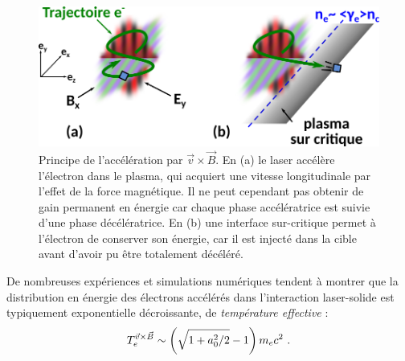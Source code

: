 \begin{refsection}
\begin{figure}[hbtp]
    \centering
    \includegraphics[width=0.7\linewidth]{2-laser/acceleration_magnetique.png}
    \caption{Principe de l'accélération par $\vec{v} \times \vec{B}$. En (a) le laser accélère l'électron dans le plasma, qui acquiert une vitesse longitudinale par l'effet de la force magnétique. Il ne peut cependant pas obtenir de gain permanent en énergie car chaque phase accélératrice est suivie d'une phase décélératrice. En (b) une interface sur-critique permet à l'électron de conserver son énergie, car il est injecté dans la cible avant d'avoir pu être totalement décéléré.}
    \label{fig:2-acceleration_magnetique}
\end{figure}

De nombreuses expériences et simulations numériques tendent à montrer que la distribution en énergie des électrons accélérés dans l'interaction laser-solide est typiquement exponentielle décroissante, de \textit{température effective} \parencite{macchi_2012} :
\begin{equation}
    T_e^{\vec{v} \times \vec{B}} \sim \left(\sqrt{1+a_0^2/2}-1\right) m_ec^2 ~ \rm . 
\end{equation}


\end{refsection}
